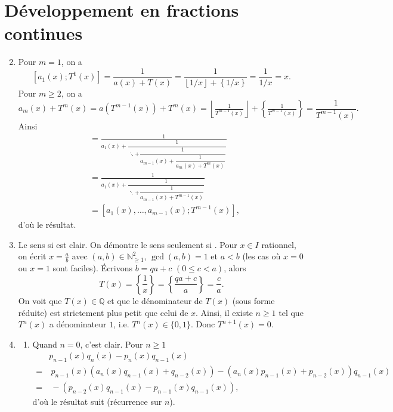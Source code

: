 \documentclass[french]{article}
\theoremstyle{definition}
\newcommand{\set}[1]{\left\{#1\right\}}
\newcommand{\floor}[1]{\left\lfloor#1\right\rfloor}
\newcommand{\Nbb}{\mathbb{N}}
\newcommand{\Qbb}{\mathbb{Q}}
\begin{document}
\section*{D\'eveloppement en fractions continues}
\begin{enumerate}
    \setcounter{enumi}{1}
    \item \label{Partie2} Pour $m = 1$, on a
        $$[a_1(x);T^1(x)] = \frac{1}{a(x) + T(x)} = \frac{1}{\floor{1/x} + \set{1/x}} = \frac{1}{1/x} = x.$$
    Pour $m \ge 2$, on a
        $$a_m(x) + T^m(x) = a(T^{m-1}(x)) + T^m(x) = \floor{\tfrac{1}{T^{m-1}(x)}} + \set{\tfrac{1}{T^{m-1}(x)}} = \frac{1}{T^{m-1}(x)}.$$
    Ainsi
        \begin{align*}
            [a_1(x),\ldots,a_m(x);T^m(x)] & = \frac{1}{a_1(x) + \dfrac{1}{\ddots + \dfrac{1}{a_{m-1}(x) + \dfrac{1}{a_m(x) + T^m(x)}}}} \\
            & = \frac{1}{a_1(x) + \dfrac{1}{\ddots + \dfrac{1}{a_{m-1}(x) + T^{m-1}(x)}}} \\
            & = [a_1(x),\ldots,a_{m-1}(x);T^{m-1}(x)],
        \end{align*}
    d'o\`u le r\'esultat.
    
    \item \label{Partie3} Le sens \og si \fg{} est clair. On d\'emontre le sens \og seulement si \fg{}. Pour $x \in I$ rationnel, on \'ecrit $x = \tfrac{a}{b}$ avec $(a,b) \in \Nbb_{\ge 1}^2$, $\gcd(a,b) = 1$ et $a < b$ (les cas o\`u $x = 0$ ou $x=1$ sont faciles). \'Ecrivons $b = qa + c$ $(0 \le c < a)$, alors 
        $$T(x) = \set{\frac{1}{x}} = \set{\frac{qa + c}{a}} = \frac{c}{a}.$$
    On voit que $T(x) \in \Qbb$ et que le d\'enominateur de $T(x)$ (sous forme r\'eduite) est strictement plus petit que celui de $x$. Ainsi, il existe $n \ge 1$ tel que $T^n(x)$ a d\'enominateur $1$, i.e. $T^n(x) \in \{0,1\}$. Donc $T^{n+1}(x) = 0$.
    
    \item \label{Partie4} 
    \begin{enumerate}
        \item \label{Partie4a}
             Quand $n = 0$, c'est clair.  Pour $n \ge 1$
                \begin{align*}
                    & p_{n-1}(x)q_n(x) - p_n(x)q_{n-1}(x) \\
                    = & \  p_{n-1}(x)(a_n(x) q_{n-1}(x) + q_{n-2}(x)) - (a_n(x) p_{n-1}(x) + p_{n-2}(x))q_{n-1}(x) \\
                    = & \  -(p_{n-2}(x)q_{n-1}(x) - p_{n-1}(x)q_{n-1}(x)),
                \end{align*}
            d'o\`u le r\'esultat suit (r\'ecurrence sur $n$).
            

\end{enumerate}
\end{enumerate}
\end{document}
